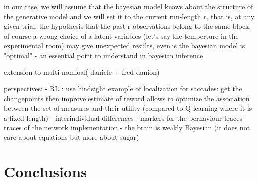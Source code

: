 \documentclass[profile,final,english, draft]{article}%
\newcommand{\citep}[1]{\parencite{#1}}
\begin{document}
in our case, we will assume that the bayesian model knows about the structure of the generative model and we will set it to the current run-length $r$, that is, at any given trial, the hypothesis that the past r observations belong to the same block. of course a wrong choice of a latent variables (let's say the temperture in the experimental room) may give unexpected results, even is the bayesian model is "optimal" - an essential point to understand in bayesian inference

extension to multi-nomioal( daniele + fred danion)





perspectives:
- RL : use hindsight example of localization for saccades: get the changepoints then improve estimate of reward allows to optimize the association between the set of measures and their utility (compared to Q-learning where it is a fixed length)
- interindividual differences : markers for the berhaviour traces - traces of the network implementation
- the brain is weakly Bayesian (it does not care about equations but more about sugar)



\section{Conclusions}
\end{document}
